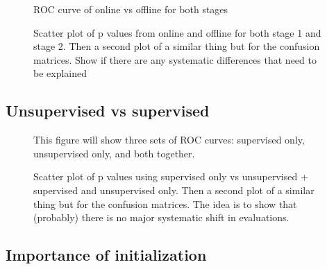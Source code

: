 \documentclass[useAMS,usenatbib,a4paper]{mn2e}
\begin{document}
\begin{figure}
\begin{center}
\end{center}
\caption{ROC curve of online vs offline for both stages}
\label{fig:offline_v_online:roc}
\end{figure}

\begin{figure}
\begin{center}
\end{center}
\caption{Scatter plot of p values from online and offline for both stage 1 and
stage 2. Then a second plot of a similar thing but for the confusion matrices.
Show if there are any systematic differences that need to be explained}
\label{fig:offline_v_online:scatter}
\end{figure}

\subsection{Unsupervised vs supervised}

\begin{figure}
\begin{center}
\end{center}
\caption{This figure will show three sets of ROC curves: supervised only,
unsupervised only, and both together.}
\label{fig:unsupervised_v_supervised:roc}
\end{figure}

\begin{figure}
\begin{center}
\end{center}
\caption{Scatter plot of p values using supervised only vs unsupervised +
supervised and unsupervised only. Then a second plot of a similar thing but for
the confusion matrices. The idea is to show that (probably) there is no major
systematic shift in evaluations.}
\label{fig:unsupervised_v_supervised:scatter}
\end{figure}



\subsection{Importance of initialization}
\end{document}

